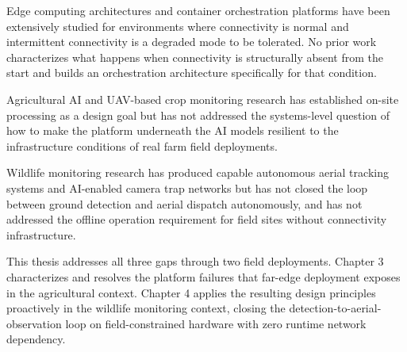 Edge computing architectures and container orchestration platforms have been extensively studied for environments where connectivity is normal and intermittent connectivity is a degraded mode to be tolerated. No prior work characterizes what happens when connectivity is structurally absent from the start and builds an orchestration architecture specifically for that condition.

Agricultural AI and UAV-based crop monitoring research has established on-site processing as a design goal but has not addressed the systems-level question of how to make the platform underneath the AI models resilient to the infrastructure conditions of real farm field deployments.

Wildlife monitoring research has produced capable autonomous aerial tracking systems and AI-enabled camera trap networks but has not closed the loop between ground detection and aerial dispatch autonomously, and has not addressed the offline operation requirement for field sites without connectivity infrastructure.

This thesis addresses all three gaps through two field deployments. Chapter 3 characterizes and resolves the platform failures that far-edge deployment exposes in the agricultural context. Chapter 4 applies the resulting design principles proactively in the wildlife monitoring context, closing the detection-to-aerial-observation loop on field-constrained hardware with zero runtime network dependency.